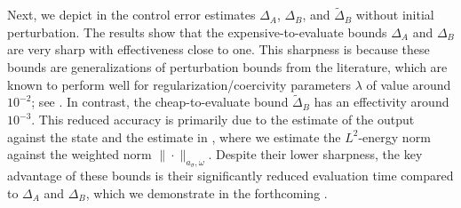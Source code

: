 \documentclass[reqno]{amsart}
\newcommand{\reduce}[1]{\tilde{#1}}
\begin{document}
%
Next, we depict in  the control error estimates $\Delta_A$, $\Delta_B$, and $\reduce{\Delta}_B$ without initial perturbation. The results show that the expensive-to-evaluate bounds $\Delta_{A}$ and $\Delta_{B}$ are very sharp with effectiveness close to one. This sharpness is because these bounds are generalizations of perturbation bounds from the literature, which are known to perform well for regularization/coercivity parameters $\lambda$ of value around $10^{-2}$; see \cite{bader2016certified, GubV17}. In contrast, the cheap-to-evaluate bound $\reduce{\Delta}_{B}$ has an effectivity around $10^{-3}$. This reduced accuracy is primarily due to the estimate of the output against the state and the estimate in , where we estimate the $L^2$-energy norm against the weighted norm $\|\cdot\|_{a_\sigma, \omega}$. Despite their lower sharpness, the key advantage of these bounds is their significantly reduced evaluation time compared to $\Delta_{A}$ and $\Delta_{B}$, which we demonstrate in the forthcoming . 
\end{document}
